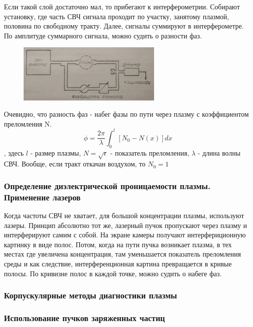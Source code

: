 \documentclass[10pt, a4paper]{article}
\begin{document}
Если такой слой достаточно мал, то прибегают к интерферометрии. Собирают установку, где часть СВЧ сигнала проходит по участку, занятому плазмой, половина по свободному тракту. Далее, сигналы суммируют в интерферометре. По амплитуде суммарного сигнала, можно судить о разности фаз.

\begin{figure}[h!]
	\begin{center}
		\includegraphics[width=70mm]{HF interferometre.JPG}
	\end{center}
\end{figure}

 Очевидно, что разность фаз - набег фазы по пути через плазму с коэффициентом преломления N.
 \begin{equation}
 	\phi = \frac{2 \pi}{\lambda} \int_{0}^{l} [N_0 - N(x)] dx 
 \end{equation} 
, здесь $l$ - размер плазмы, $N=\sqrt{\epsilon}$ - показатель преломления, $\lambda$ - длина волны СВЧ. Вообще, если тракт откачан воздухом, то $N_0 =1$


\subsubsection{Определение диэлектрической проницаемости плазмы. Применение лазеров}

Когда частоты СВЧ не хватает, для большой концентрации плазмы, используют лазеры.
Принцип абсолютно тот же, лазерный пучок пропускают через плазму и интерферируют самим с собой. На экране камеры получают интерфериционную картинку в виде полос. Потом, когда на пути пучка возникает плазма, в тех местах где увеличена концентрация, там уменьшается показатель преломления среды и как следствие, интерференционная картина превращается в кривые полосы. По кривизне полос в каждой точке, можно судить о набеге фаз.

\subsubsection{Корпускулярные методы диагностики плазмы}

\subsubsection{Использование пучков заряженных частиц}
\end{document}
